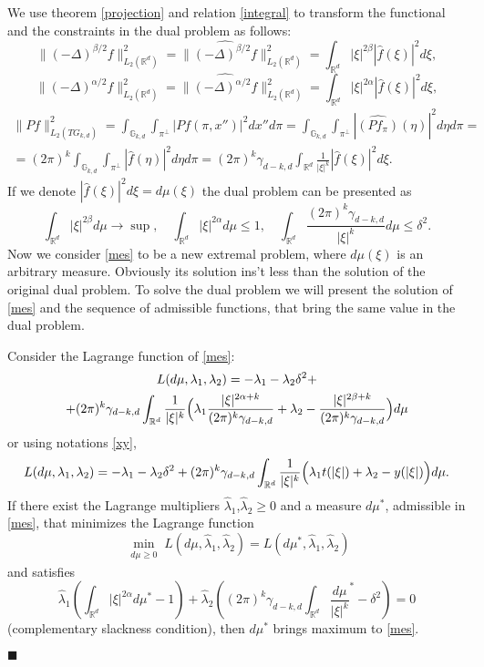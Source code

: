 \documentclass[12pt]{iopart}
\newenvironment{proof}
{\par\noindent{\bf Proof}}
{\hfill$\scriptstyle\blacksquare$}
\begin{document}
\begin{proof}
We use theorem \ref{projection} and relation \eqref{integral} to transform the functional and the constraints in the dual problem as follows: 
\[
  \|(-\Delta)^{\beta/2}f\|^2_{L_2(\mathbb R^d)}=\|\widehat{(-\Delta)^{\beta/2}f}\|^2_{L_2(\mathbb R^d)}=\int_{\mathbb R^d}|\xi|^{2\beta}|\widehat{f}(\xi )|^2d\xi,
\]
\[ \| (-\Delta)^{\alpha/2}f\|^2_{L_2(\mathbb R^d)}=\|\widehat{(-\Delta)^{\alpha/2}f}\|^2_{L_2(\mathbb R^d)}=\int_{\mathbb R^d}|\xi|^{2\alpha} |\widehat{f}(\xi)|^2d\xi,
\]
\begin{multline*}
  \|Pf\|^2_{L_2(TG_{k,d})}=\int_{\mathbb G_{k,d}}\int_{\pi^\perp}|Pf(\pi,x'')|^2  dx''d\pi =
  \int_{\mathbb G_{k,d}}\int_{\pi^\perp}|\widehat{(Pf_\pi)}(\eta)|^2  d\eta d\pi = \\
  =(2\pi)^{k}\int_{\mathbb G_{k,d}}\int_{\pi^\perp}|\widehat
  f(\eta )|^2d\eta d\pi =
  (2\pi)^{k}\gamma_{d-k,d}\int_{\mathbb R^d}\frac{1}{|\xi|^k}|\widehat f(\xi )|^2d\xi.
\end{multline*}
If we denote $|\widehat f(\xi)|^2 d\xi =d\mu(\xi)$ the dual problem can be presented as
  \begin{equation}
  \label{mes}
  \int_{\mathbb R^d}|\xi|^{2\beta}d\mu\to \sup,\quad
  \int_{\mathbb R^d}|\xi|^{2\alpha}d\mu\leqslant  1,\quad\int_{\mathbb R^d}\frac{(2\pi)^{k}\gamma_{d-k,d}}{|\xi|^k}d\mu\leqslant \delta^2.
  \end{equation}
Now we consider \eqref{mes} to be a new extremal problem, where $d\mu(\xi)$ is an arbitrary measure. Obviously its solution ins't less than the solution of the original dual problem. To solve the dual problem we will present the solution of \eqref{mes} and the sequence of admissible functions, that bring the same value in the dual problem.

Consider the Lagrange function of \eqref{mes}:
 \begin{multline*}
L(d\mu ,\lambda_1,\lambda_2)=-\lambda_1-\lambda_2\delta^2+\\
  +(2\pi)^{k}\gamma_{d-k,d}\int_{\mathbb R^d}\frac{1}{|\xi|^k}\Bigl(\lambda_1\frac{|\xi|^{2\alpha+k}}{(2\pi)^{k}\gamma_{d-k,d}}+\lambda_2-\frac{|\xi|^{2\beta+k}}{(2\pi)^{k}\gamma_{d-k,d}}\Bigr)d\mu
\end{multline*}
or using notations \eqref{xy},
 $$
L(d\mu ,\lambda_1,\lambda_2)=-\lambda_1-\lambda_2\delta^2+(2\pi)^{k}\gamma_{d-k,d}\int_{\mathbb R^d}\frac{1}{|\xi|^k}\Bigl(\lambda_1t(|\xi|)+\lambda_2-y(|\xi|)\Bigr)d\mu.
$$
If there exist the Lagrange multipliers $\widehat\lambda_1$,$\widehat\lambda_2\ge 0$ and a measure $d\mu^*$, admissible in \eqref{mes}, that minimizes the Lagrange function
	$$\min_{
\begin{smallmatrix}
d\mu\ge 0
\end{smallmatrix}} L(d\mu,\widehat{\lambda}_1,\widehat{\lambda}_2)=L(d\mu^*,\widehat{\lambda}_1,\widehat{\lambda}_2)$$ and satisfies
$$
\widehat\lambda_1\left(\int_{\mathbb R^d}|\xi|^{2\alpha}d\mu^*-1\right)+\widehat\lambda_2\left((2\pi)^{k}\gamma_{d-k,d}\int_{\mathbb
    R^d}\frac{d\mu}{|\xi|^k}^*-\delta^2 \right)=0
$$
 (complementary slackness condition), then $d\mu^*$ brings maximum to \eqref{mes}. 


\end{proof}
\end{document}
